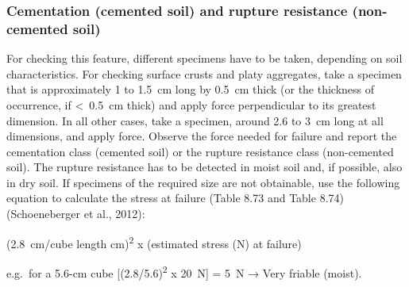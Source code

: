 \documentclass[
  letterpaper,
  DIV=11,
  numbers=noendperiod]{scrreprt}
\begin{document}
\hypertarget{cementation-cemented-soil-and-rupture-resistance-non-cemented-soil}{%
\subsubsection{Cementation (cemented soil) and rupture resistance
(non-cemented
soil)}\label{cementation-cemented-soil-and-rupture-resistance-non-cemented-soil}}

For checking this feature, different specimens have to be taken,
depending on soil characteristics. For checking surface crusts and platy
aggregates, take a specimen that is approximately 1 to 1.5~cm long by
0.5~cm thick (or the thickness of occurrence, if \textless~0.5~cm thick)
and apply force perpendicular to its greatest dimension. In all other
cases, take a specimen, around 2.6 to 3~cm long at all dimensions, and
apply force. Observe the force needed for failure and report the
cementation class (cemented soil) or the rupture resistance class
(non-cemented soil). The rupture resistance has to be detected in moist
soil and, if possible, also in dry soil. If specimens of the required
size are not obtainable, use the following equation to calculate the
stress at failure (Table 8.73 and Table 8.74) (Schoeneberger et al.,
2012):

(2.8~cm/cube length cm)\textsuperscript{2} x (estimated stress (N) at
failure)

e.g.~for a 5.6-cm cube {[}(2.8/5.6)\textsuperscript{2} x 20~N{]} = 5~N →
Very friable (moist).
\end{document}
